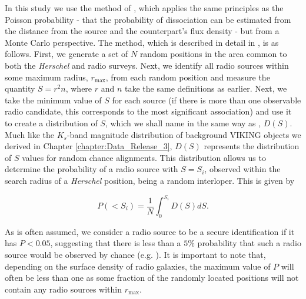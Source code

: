 In this study we use the method of \citealt{Lilly_1999}, which applies the same principles as the Poisson probability - that the probability of dissociation can be estimated from the distance from the source and the counterpart's flux density - but from a Monte Carlo perspective. The method, which is described in detail in \citealt{Dye_2009}, is as follows. First, we generate a set of $N$ random positions in the area common to both the \textit{Herschel} and radio surveys. Next, we identify all radio sources within some maximum radius, $r_{\textrm{max}}$, from each random position and measure the quantity $S = r^2n$, where $r$ and $n$ take the same definitions as earlier. Next, we take the minimum value of $S$ for each source (if there is more than one observable radio candidate, this corresponds to the most significant association) and use it to create a distribution of $S$, which we shall name in the same way as \citealt{Dye_2009}, $D(S)$. Much like the $K_s$-band magnitude distribution of background VIKING objects we derived in Chapter \ref{chapter:Data_Release_3}, $D(S)$ represents the distribution of $S$ values for random chance alignments. This distribution allows us to determine the probability of a radio source with $S = S_i$, observed within the search radius of a \textit{Herschel} position, being a random interloper. This is given by

\begin{equation}
    P(< S_i) = \frac{1}{N}\int_0^{S_i}D(S) dS.
    \label{eq:probability_frequentist}
\end{equation}

As is often assumed, we consider a radio source to be a secure identification if it has $P < 0.05$, suggesting that there is less than a $5\%$ probability that such a radio source would be observed by chance (e.g. \citealt{Ivison_2002, Ivison_2005, Pope_2006}). It is important to note that, depending on the surface density of radio galaxies, the maximum value of $P$ will often be less than one as some fraction of the randomly located positions will not contain any radio sources within $r_{\textrm{max}}$. 

